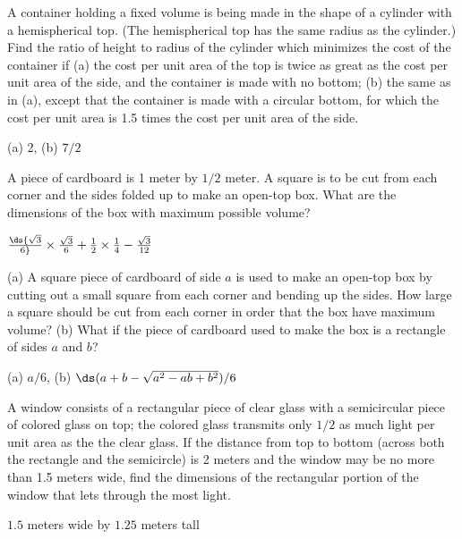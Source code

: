 \begin{enumialphparenastyle}

\begin{ex}
A container holding a fixed volume is being made in the shape of a cylinder
with a hemispherical top.  (The hemispherical top has the same radius
as the cylinder.)  Find the ratio of height to radius of the cylinder which
minimizes the cost of the container if (a) the cost per unit area of the
top is twice as great as the cost per unit area of the side, and the
container is made with no bottom; (b) the same as in (a), except that the
container is made with a circular bottom, for which the cost per unit area is
1.5 times the cost per unit area of the side.
\begin{sol}
 (a) 2, (b) $7/2$
\end{sol}
\end{ex}

\begin{ex}
 A piece of cardboard is 1 meter by $1/2$ meter. A square is
to be cut from each corner and the sides folded up to make an open-top
box. What are the dimensions of the box with maximum possible volume?
\begin{sol}
 $\ds{\sqrt3\over6}\times{\sqrt3\over6}+{1\over2}\times
{1\over4}-{\sqrt3\over 12}$
\end{sol}
\end{ex}


\begin{ex}
\label{exercise: cardboard box} (a) A square piece of cardboard of side $a$ is used to make
an open-top box by cutting out a small square from each corner and
bending up the sides.  How large a square should be cut from each
corner in order that the box have maximum volume? (b) What if the
piece of cardboard used to make the box is a rectangle of sides $a$
and $b$?  
\begin{sol}
 (a) $a/6$, (b) $\ds (a+b-\sqrt{a^2-ab+b^2})/6$
\end{sol}
\end{ex} 


\begin{ex}
 A window consists of a rectangular piece of clear glass with
a semicircular piece of colored glass on top; the
colored glass transmits only $1/2$ as much light per unit area as the
the clear glass.  If the distance from
top to bottom (across both the rectangle and the semicircle) is
2 meters and the window may be no more than 1.5 meters wide, find the
dimensions of the rectangular portion of the window that lets through
the most light.
\begin{sol}
 $1.5$ meters wide by $1.25$ meters tall
\end{sol}
\end{ex} 


\end{enumialphparenastyle}
